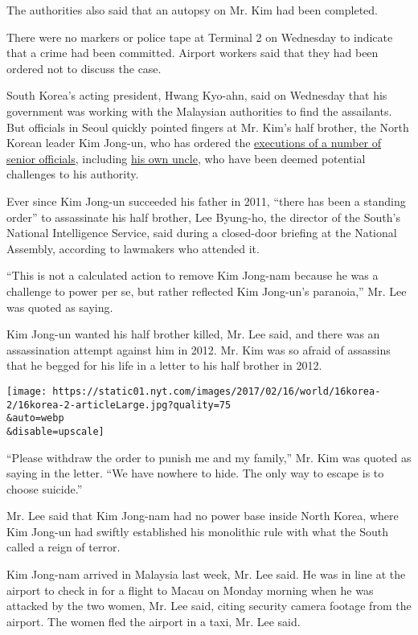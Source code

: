 The authorities also said that an autopsy on Mr. Kim had been completed.

There were no markers or police tape at Terminal 2 on Wednesday to
indicate that a crime had been committed. Airport workers said that they
had been ordered not to discuss the case.

South Korea's acting president, Hwang Kyo-ahn, said on Wednesday that
his government was working with the Malaysian authorities to find the
assailants. But officials in Seoul quickly pointed fingers at Mr. Kim's
half brother, the North Korean leader Kim Jong-un, who has ordered the
\href{https://www.nytimes.com/2015/04/30/world/asia/north-korea-executed-15-top-officials-in-2015-south-korean-agency-says.html}{executions
of a number of senior officials}, including
\href{http://www.nytimes.com/2013/12/24/world/asia/north-korea-purge.html}{his
own uncle}, who have been deemed potential challenges to his authority.

Ever since Kim Jong-un succeeded his father in 2011, ``there has been a
standing order'' to assassinate his half brother, Lee Byung-ho, the
director of the South's National Intelligence Service, said during a
closed-door briefing at the National Assembly, according to lawmakers
who attended it.

``This is not a calculated action to remove Kim Jong-nam because he was
a challenge to power per se, but rather reflected Kim Jong-un's
paranoia,'' Mr. Lee was quoted as saying.

Kim Jong-un wanted his half brother killed, Mr. Lee said, and there was
an assassination attempt against him in 2012. Mr. Kim was so afraid of
assassins that he begged for his life in a letter to his half brother in
2012.

\texttt{[image: https://static01.nyt.com/images/2017/02/16/world/16korea-2/16korea-2-articleLarge.jpg?quality=75\\\&auto=webp\\\&disable=upscale]}

``Please withdraw the order to punish me and my family,'' Mr. Kim was
quoted as saying in the letter. ``We have nowhere to hide. The only way
to escape is to choose suicide.''

Mr. Lee said that Kim Jong-nam had no power base inside North Korea,
where Kim Jong-un had swiftly established his monolithic rule with what
the South called a reign of terror.

Kim Jong-nam arrived in Malaysia last week, Mr. Lee said. He was in line
at the airport to check in for a flight to Macau on Monday morning when
he was attacked by the two women, Mr. Lee said, citing security camera
footage from the airport. The women fled the airport in a taxi, Mr. Lee
said.

